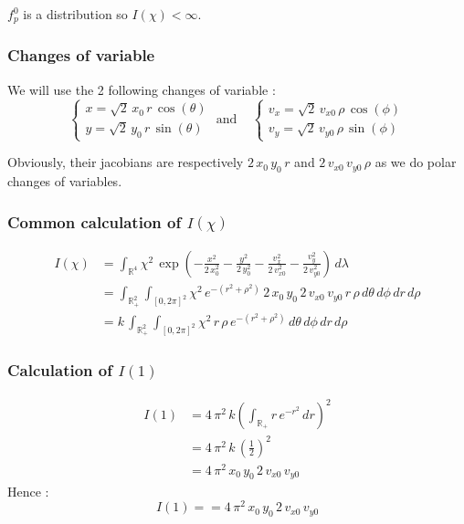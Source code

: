 \documentclass[10pt]{article}
\begin{document}
$f_p^0$ is a distribution so $I(\chi) < \infty$. \\

\subsubsection{Changes of variable}

We will use the 2 following changes of variable :
$$
\boxed{\left\lbrace
    \begin{array}{ll}
x = \sqrt{2}\,x_0\,r\,\cos(\theta) \\
y = \sqrt{2}\,y_0\,r\,\sin(\theta)
    \end{array}
\right. 
\mbox{ and } \;\;\;
\left\lbrace
    \begin{array}{ll}
v_x = \sqrt{2}\,v_{x0}\,\rho\,\cos(\phi) \\
v_y = \sqrt{2}\,v_{y0}\,\rho\,\sin(\phi)
    \end{array}
\right.
}
$$

Obviously, their jacobians are respectively $2\,x_0\,y_0\,r$ and $2\,v_{x0}\,v_{y0}\,\rho$ as we do polar changes of variables.

\subsubsection{Common calculation of $I(\chi)$}

\begin{align*}
I(\chi) &= \int_{\mathbb{R}^4} \chi^{2}\, \exp\left(-\frac{x^2}{2\,x_{0}^2}-\frac{y^2}{2\,y_{0}^2}-\frac{v_x^2}{2\,v_{x0}^2}-\frac{v_y^2}{2\,v_{y0}^2} \right) \,d\lambda \\
&= \int_{\mathbb{R}_{+}^2}\int_{[0,2\pi]^2} \chi^{2}\, e^{-(r^2+\rho^{2})}\,2\,x_0\,y_0\,2\,v_{x0}\,v_{y0}\,r\,\rho\,d\theta\,d\phi\,dr\,d\rho \\
&= k\, \int_{\mathbb{R}_{+}^2}\int_{[0,2\pi]^2} \chi^{2}\,r\,\rho\, e^{-(r^2+\rho^{2})}\,d\theta\,d\phi\,dr\,d\rho 
\end{align*}

\subsubsection{Calculation of $I(1)$}

\begin{align*}
I(1) &= 4\,\pi^{2}\,k \left(\int_{\mathbb{R}_{+}}r\,e^{-r^2}\,dr \right)^2 \\
&= 4\,\pi^{2}\,k\,\left(\frac{1}{2}\right)^2 \\
&= 4\,\pi^{2}\,x_0\,y_0\,2\,v_{x0}\,v_{y0}
\end{align*}
Hence :
$$\boxed{I(1) = = 4\,\pi^{2}\,x_0\,y_0\,2\,v_{x0}\,v_{y0}}$$
\end{document}
